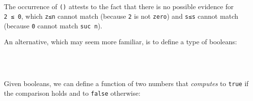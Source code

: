 \begin{fence}
\begin{code}%
\>[0]\AgdaSpace{}%
\AgdaSymbol{:}\AgdaSpace{}%
\AgdaSpace{}%
\AgdaSpace{}%
\<%
\\
\>[0]\AgdaSpace{}%
\AgdaSymbol{=}\AgdaSpace{}%
\AgdaSpace{}%
\AgdaSymbol{(}\AgdaSpace{}%
\AgdaSymbol{)}\<%
\\
%
\\[\AgdaEmptyExtraSkip]%
\>[0]\AgdaSpace{}%
\AgdaSymbol{:}\AgdaSpace{}%
\AgdaSpace{}%
\AgdaSymbol{(}\AgdaSpace{}%
\AgdaSpace{}%
\AgdaSymbol{)}\<%
\\
\>[0]\AgdaSpace{}%
\AgdaSymbol{(}\AgdaSpace{}%
\AgdaSymbol{(}\AgdaSpace{}%
\AgdaSymbol{()))}\<%
\end{code}
\end{fence}

The occurrence of \texttt{()} attests to the fact that there is no
possible evidence for \texttt{2\ ≤\ 0}, which \texttt{z≤n} cannot match
(because \texttt{2} is not \texttt{zero}) and \texttt{s≤s} cannot match
(because \texttt{0} cannot match \texttt{suc\ n}).

An alternative, which may seem more familiar, is to define a type of
booleans:

\begin{fence}
\begin{code}%
\>[0]\AgdaSpace{}%
\AgdaSpace{}%
\AgdaSymbol{:}\AgdaSpace{}%
\AgdaSpace{}%
\<%
\\
\>[0][@{}l@{\AgdaIndent{0}}]%
\>[2]%
\>[8]\AgdaSymbol{:}\AgdaSpace{}%
\<%
\\
%
\>[2]\AgdaSpace{}%
\AgdaSymbol{:}\AgdaSpace{}%
\<%
\end{code}
\end{fence}

Given booleans, we can define a function of two numbers that
\emph{computes} to \texttt{true} if the comparison holds and to
\texttt{false} otherwise:

